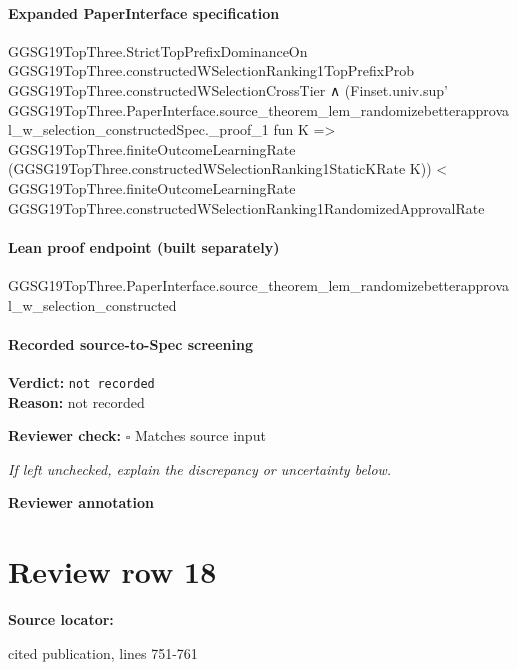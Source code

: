\documentclass[10pt]{article}
\newcommand{\reviewerbox}{%
  \par\noindent\fbox{\parbox{0.96\linewidth}{\rule{0pt}{0.38in}}}\par
}
\newcommand{\reviewmatch}[1]{%
  \par\noindent\textbf{Reviewer check:} $\square$\; #1\par
  \noindent\emph{If left unchecked, explain the discrepancy or uncertainty below.}\par
}
\begin{document}
\paragraph{Expanded PaperInterface specification}
\begin{ReviewVerbatim}
GGSG19TopThree.StrictTopPrefixDominanceOn GGSG19TopThree.constructedWSelectionRanking1TopPrefixProb
    GGSG19TopThree.constructedWSelectionCrossTier ∧
  (Finset.univ.sup'
      GGSG19TopThree.PaperInterface.source_theorem_lem_randomizebetterapproval_w_selection_constructedSpec._proof_1
      fun K => GGSG19TopThree.finiteOutcomeLearningRate (GGSG19TopThree.constructedWSelectionRanking1StaticKRate K)) <
    GGSG19TopThree.finiteOutcomeLearningRate GGSG19TopThree.constructedWSelectionRanking1RandomizedApprovalRate
\end{ReviewVerbatim}

\paragraph{Lean proof endpoint (built separately)}\begin{ReviewVerbatim}
GGSG19TopThree.PaperInterface.source_theorem_lem_randomizebetterapproval_w_selection_constructed
\end{ReviewVerbatim}

\paragraph{Recorded source-to-Spec screening}
\textbf{Verdict:} \texttt{not recorded}
\\
\textbf{Reason:} not recorded
\reviewmatch{Matches source input}
\noindent\textbf{Reviewer annotation}\par
\reviewerbox
\clearpage
\hypertarget{source-claim-96dd41305a1cb5af}{}
\section*{Review row 18}
\textbf{Source locator:} {\footnotesize\raggedright cited publication, lines 751-\allowbreak{}761\par}
\end{document}
